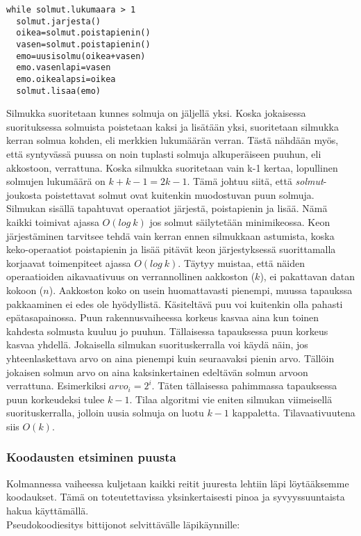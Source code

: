 \documentclass[a4paper, 12pt, finnish]{article}
\begin{document}
\begin{lstlisting}
while solmut.lukumaara > 1
  solmut.jarjesta()
  oikea=solmut.poistapienin()
  vasen=solmut.poistapienin()
  emo=uusisolmu(oikea+vasen)
  emo.vasenlapi=vasen
  emo.oikealapsi=oikea
  solmut.lisaa(emo)

\end{lstlisting}
Silmukka suoritetaan kunnes solmuja on jäljellä yksi. Koska jokaisessa suorituksessa solmuista poistetaan kaksi ja lisätään yksi, suoritetaan silmukka kerran solmua kohden, eli merkkien lukumäärän verran. Tästä nähdään myös, että syntyvässä puussa on noin tuplasti solmuja alkuperäiseen puuhun, eli akkostoon, verrattuna. Koska silmukka suoritetaan vain k-1 kertaa, lopullinen solmujen lukumäärä on $k+k-1=2k-1$. Tämä johtuu siitä, että \textit{solmut}-joukosta poistettavat solmut ovat kuitenkin muodostuvan puun solmuja.
Silmukan sisällä tapahtuvat operaatiot järjestä, poistapienin ja lisää. Nämä kaikki toimivat ajassa $O(log~k)$ jos solmut säilytetään minimikeossa. Keon järjestäminen tarvitsee tehdä vain kerran ennen silmukkaan astumista, koska keko-operaatiot poistapienin ja lisää pitävät keon järjestyksessä suorittamalla korjaavat toimenpiteet ajassa $O(log~k)$. Täytyy muistaa, että näiden operaatioiden aikavaativuus on verrannollinen aakkoston ($k$), ei pakattavan datan kokoon ($n$). Aakkoston koko on usein huomattavasti pienempi, muussa tapaukssa pakkaaminen ei edes ole hyödyllistä.
Käsiteltävä puu voi kuitenkin olla pahasti epätasapainossa. Puun rakennusvaiheessa korkeus kasvaa aina kun toinen kahdesta solmusta kuuluu jo puuhun. Tällaisessa tapauksessa puun korkeus kasvaa yhdellä. Jokaisella silmukan suorituskerralla voi käydä näin, jos yhteenlaskettava arvo on aina pienempi kuin seuraavaksi pienin arvo. Tällöin jokaisen solmun arvo on aina kaksinkertainen edeltävän solmun arvoon verrattuna. Esimerkiksi $arvo_{i}=2^i$. Täten tällaisessa pahimmassa tapauksessa puun korkeudeksi tulee $k-1$.
Tilaa algoritmi vie eniten silmukan viimeisellä suorituskerralla, jolloin uusia solmuja on luotu $k-1$ kappaletta. Tilavaativuutena siis $O(k)$.

\subsubsection{Koodausten etsiminen puusta}
Kolmannessa vaiheessa kuljetaan kaikki reitit juuresta lehtiin läpi löytääksemme koodaukset. Tämä on toteutettavissa yksinkertaisesti pinoa ja syvyyssuuntaista hakua käyttämällä.
\\
Pseudokoodiesitys bittijonot selvittävälle läpikäynnille:
\end{document}
